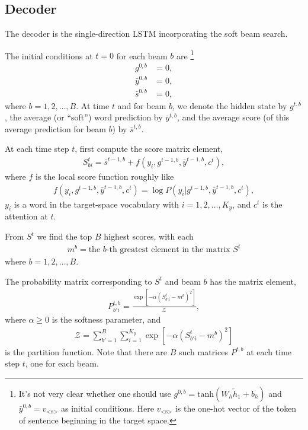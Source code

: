 \documentclass{article}
\begin{document}
\subsection{Decoder}

	The decoder is the single-direction LSTM incorporating the soft beam search.
	
	The initial conditions at $t = 0$ for each beam $b$ are%
		\footnote{It's not very clear whether one should use $g^{0, b} = \textrm{tanh}(W_h \overleftarrow{h}_1 + b_h)$ and $\bar{y}^{0, b} = v_{\textrm{<s>}}$ as initial conditions. Here $v_{\textrm{<s>}}$ is the one-hot vector of the token of sentence beginning in the target space.}
		\begin{align}
			g^{0, b} &= 0, \\
			\bar{y}^{0, b} &= 0, \\
			\bar{s}^{0, b} &= 0,
		\end{align}
		where $b = 1, 2, \dots, B$. At time $t$ and for beam $b$, we denote the hidden state by $g^{t, b}$, the average (or ``soft'') word prediction by $\bar{y}^{t, b}$, and the average score (of this average prediction for beam $b$) by $\bar{s}^{t, b}$.
	
	At each time step $t$, first compute the score matrix element,
		\begin{align}
			S^t_{b i} = \bar{s}^{t-1, b} + f(y_i, g^{t-1, b}, \bar{y}^{t-1, b}, c^t),
		\end{align}
		where $f$ is the local score function roughly like
		\begin{align}
			f(y_i, g^{t-1, b}, \bar{y}^{t-1, b}, c^t) = \log P(y_i | g^{t-1, b}, \bar{y}^{t-1, b}, c^t),
		\end{align}
		$y_i$ is a word in the target-space vocabulary with $i = 1, 2, \dots, K_y$, and $c^t$ is the attention at $t$.

	From $S^t$ we find the top $B$ highest scores, with each
		\begin{align}
			m^{b} = \textrm{the $b$-th greatest element in the matrix $S^t$}
		\end{align}
		where $b = 1, 2, \dots, B$.
	
	The probability matrix corresponding to $S^t$ and beam $b$ has the matrix element,
		\begin{align}
			P^{t, b}_{b' i} = \frac{\exp[-\alpha ( S^t_{b' i} - m^{b} )^2]}{\mathcal{Z}},
		\end{align}
		where $\alpha \geq 0$ is the softness parameter, and
		\begin{align}
			\mathcal{Z} = \sum_{b' = 1}^B \sum_{i = 1}^{K_y} \exp[-\alpha ( S^t_{b' i} - m^{b} )^2]
		\end{align}
		is the partition function. Note that there are $B$ such matrices $P^{t, b}$ at each time step $t$, one for each beam.
\end{document}
